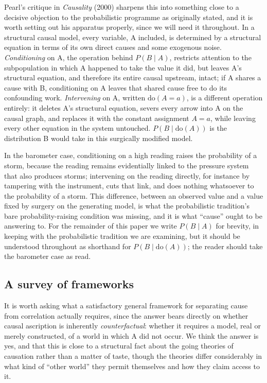 \documentclass[11pt]{article}
\theoremstyle{definition}
\begin{document}
Pearl's critique in \emph{Causality} (2000) sharpens this into something close to a decisive objection to the probabilistic programme as originally stated, and it is worth setting out his apparatus properly, since we will need it throughout. In a structural causal model, every variable, A included, is determined by a structural equation in terms of its own direct causes and some exogenous noise. \emph{Conditioning} on A, the operation behind $P(B \mid A)$, restricts attention to the subpopulation in which A happened to take the value it did, but leaves A's structural equation, and therefore its entire causal upstream, intact; if A shares a cause with B, conditioning on A leaves that shared cause free to do its confounding work. \emph{Intervening} on A, written $\mathrm{do}(A=a)$, is a different operation entirely: it deletes A's structural equation, severs every arrow into A on the causal graph, and replaces it with the constant assignment $A=a$, while leaving every other equation in the system untouched. $P(B \mid \mathrm{do}(A))$ is the distribution B would take in this surgically modified model.

In the barometer case, conditioning on a high reading raises the probability of a storm, because the reading remains evidentially linked to the pressure system that also produces storms; intervening on the reading directly, for instance by tampering with the instrument, cuts that link, and does nothing whatsoever to the probability of a storm. This difference, between an observed value and a value fixed by surgery on the generating model, is what the probabilistic tradition's bare probability-raising condition was missing, and it is what ``cause'' ought to be answering to. For the remainder of this paper we write $P(B \mid A)$ for brevity, in keeping with the probabilistic tradition we are examining, but it should be understood throughout as shorthand for $P(B \mid \mathrm{do}(A))$; the reader should take the barometer case as read.

\subsection{A survey of frameworks}
\label{subsec:survey}

It is worth asking what a satisfactory general framework for separating cause from correlation actually requires, since the answer bears directly on whether causal ascription is inherently \emph{counterfactual}: whether it requires a model, real or merely constructed, of a world in which A did not occur. We think the answer is yes, and that this is close to a structural fact about the going theories of causation rather than a matter of taste, though the theories differ considerably in what kind of ``other world'' they permit themselves and how they claim access to it.
\end{document}
